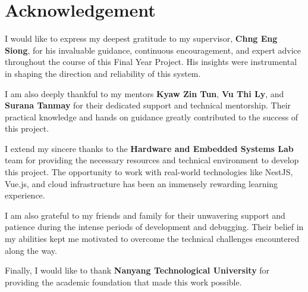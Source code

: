 \chapter*{Acknowledgement}

I would like to express my deepest gratitude to my supervisor, \textbf{Chng Eng Siong}, for his invaluable guidance, continuous encouragement, and expert advice throughout the course of this Final Year Project. His insights were instrumental in shaping the direction and reliability of this system.

I am also deeply thankful to my mentors \textbf{Kyaw Zin Tun}, \textbf{Vu Thi Ly}, and \textbf{Surana Tanmay} for their dedicated support and technical mentorship. Their practical knowledge and hands on guidance greatly contributed to the success of this project.

I extend my sincere thanks to the \textbf{Hardware and Embedded Systems Lab} team for providing the necessary resources and technical environment to develop this project. The opportunity to work with real-world technologies like NestJS, Vue.js, and cloud infrastructure has been an immensely rewarding learning experience.

I am also grateful to my friends and family for their unwavering support and patience during the intense periods of development and debugging. Their belief in my abilities kept me motivated to overcome the technical challenges encountered along the way.

Finally, I would like to thank \textbf{Nanyang Technological University} for providing the academic foundation that made this work possible.

